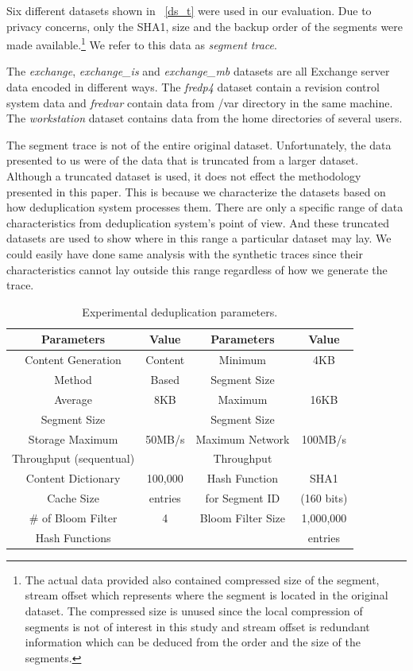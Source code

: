 Six different datasets shown in \tablename~\ref{ds_t} were used in our evaluation. Due to privacy concerns, only the SHA1, size and the backup order of the segments were made available.\footnote{The actual data provided also contained compressed size of the segment, stream offset which represents where the segment is located in the original dataset. The compressed size is unused since the local compression of segments is not of interest in this study and stream offset is redundant information which can be deduced from the order and the size of the segments.} We refer to this data as \emph{segment trace}. 

The \emph{exchange}, \emph{exchange\_is} and \emph{exchange\_mb} datasets are all Exchange server data encoded in different ways. The \emph{fredp4} dataset contain a revision control system data and \emph{fredvar} contain data from /var directory in the same machine. The \emph{workstation} dataset contains data from the home directories of several users.  

The segment trace is not of the entire original dataset. Unfortunately, the data presented to us were of the data that is truncated from a larger dataset. Although a truncated dataset is used, it does not effect the methodology presented in this paper. This is because we characterize the datasets based on how deduplication system processes them. There are only a specific range of data characteristics from deduplication system's point of view. And these truncated datasets are used to show where in this range a particular dataset may lay. We could easily have done same analysis with the synthetic traces since their characteristics cannot lay outside this range regardless of how we generate the trace. 

\begin{table}[!t]
\renewcommand{\arraystretch}{1.3}
\caption{Experimental deduplication parameters.}
\label{ex_t}
\centering
\begin{tabular}{c|c|| c| c}
\hline
\bfseries Parameters 	&\bfseries Value		&\bfseries Parameters 	&\bfseries Value		\\
\hline\hline
Content Generation	&Content			&Minimum 			&4KB				\\
Method			&Based			&Segment Size		&				\\
\hline
Average			&8KB				&Maximum			&16KB			\\
Segment Size		&				&Segment Size		&				\\
\hline
Storage Maximum	 	&50MB/s 			&Maximum Network	&100MB/s			\\
Throughput (sequentual)	& 				&Throughput		&				\\
\hline
Content Dictionary		&100,000			&Hash Function		&SHA1			\\
Cache Size			&entries			&for Segment ID		&(160 bits)			\\
\hline
\# of Bloom Filter 		&4				&Bloom Filter Size		&1,000,000			\\
Hash Functions 		&				&				&entries			\\
\hline
\end{tabular}
\end{table}

